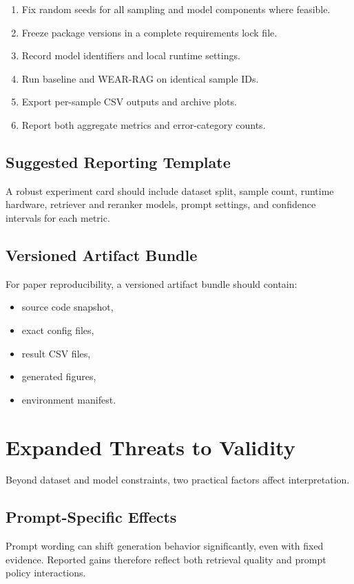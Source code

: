 \documentclass[10pt,draftclsnofoot,onecolumn,journal]{IEEEtran}
\begin{document}
\begin{enumerate}
\item Fix random seeds for all sampling and model components where feasible.
\item Freeze package versions in a complete requirements lock file.
\item Record model identifiers and local runtime settings.
\item Run baseline and WEAR-RAG on identical sample IDs.
\item Export per-sample CSV outputs and archive plots.
\item Report both aggregate metrics and error-category counts.
\end{enumerate}

\subsection{Suggested Reporting Template}
A robust experiment card should include dataset split, sample count, runtime hardware, retriever and reranker models, prompt settings, and confidence intervals for each metric.

\subsection{Versioned Artifact Bundle}
For paper reproducibility, a versioned artifact bundle should contain:
\begin{itemize}
\item source code snapshot,
\item exact config files,
\item result CSV files,
\item generated figures,
\item environment manifest.
\end{itemize}

\section{Expanded Threats to Validity}
Beyond dataset and model constraints, two practical factors affect interpretation.

\subsection{Prompt-Specific Effects}
Prompt wording can shift generation behavior significantly, even with fixed evidence. Reported gains therefore reflect both retrieval quality and prompt policy interactions.
\end{document}

